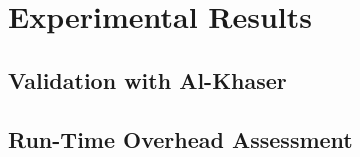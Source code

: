 
\chapter{Experimental Results}

\lipsum[23]

\section{Validation with Al-Khaser}

\section{Run-Time Overhead Assessment}